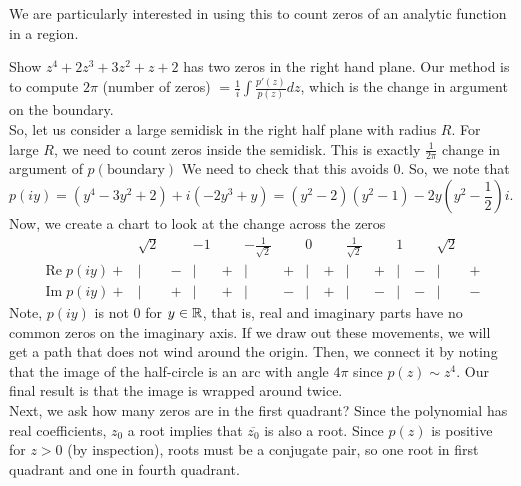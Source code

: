 \documentclass[11pt,leqno,oneside]{amsart}
\numberwithin{thm}{section}
\renewcommand{\Re}{\operatorname{Re}}
\renewcommand{\Im}{\operatorname{Im}}
\begin{document}
  We are particularly interested in using this to count zeros of an
  analytic function in a region.
  \begin{example}
    Show $z^4+2z^3+3z^2+z+2$ has two zeros in the right hand
    plane. Our method is to compute $2\pi$ (number of zeros) $=
    \frac{1}{i} \int \frac{p'(z)}{p(z)}dz$, which is the change in
    argument on the boundary. \\

    So, let us consider a large semidisk in the right half plane with
    radius $R$. For large $R$, we need to count zeros inside the
    semidisk. This is exactly $\frac{1}{2\pi}$ change in argument of
    $p(\text{boundary})$ We need to check that this avoids 0. So, we
    note that \[
      p(iy) = (y^4-3y^2+2) + i(-2y^3+y) = (y^2-2)(y^2-1) -
      2y(y^2-\frac{1}{2})i.
    \]
    Now, we create a chart to look at the change across the zeros
    \[
    \begin{array}{ccccccccccccccc}
      &\sqrt{2}&&-1&&-\frac{1}{\sqrt{2}}&&0&&\frac{1}{\sqrt{2}}&&1&&\sqrt{2}&
      \\
      \Re p(iy) + &|& - &|& + &|& + &|& + &|& + &|& - &|& + \\
      \Im p(iy) + &|& + &|& + &|& - &|& + &|& - &|& - &|& -
    \end{array}
    \]
    Note, $p(iy)$ is not 0 for $y \in {\mathbb R}$, that is, real and imaginary
    parts have no common zeros on the imaginary axis. If we draw out
    these movements, we will get a path that does not wind around the
    origin. Then, we connect it by noting that the image of the
    half-circle is an arc with angle $4\pi$ since $p(z) \sim z^4$. Our
    final result is that the image is wrapped around twice. \\

    Next, we ask how many zeros are in the first quadrant? Since the
    polynomial has real coefficients, $z_0$ a root implies that
    $\overline{z_0}$ is also a root. Since $p(z)$ is positive for $z >
    0$ (by inspection), roots must be a conjugate pair, so one root in
    first quadrant and one in fourth quadrant.
  \end{example}
\end{document}
